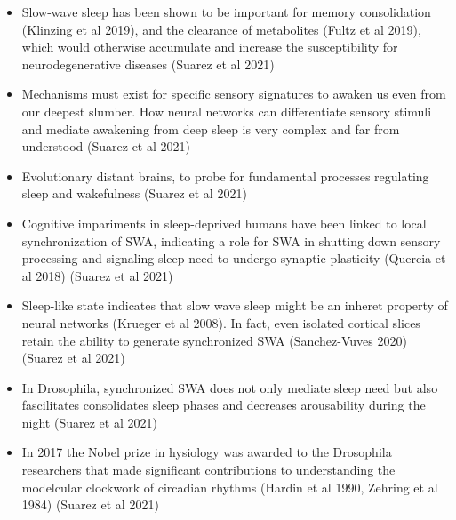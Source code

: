 \documentclass[11pt]{article}
\begin{document}
\begin{itemize}
    \item Slow-wave sleep has been shown to be important for memory consolidation (Klinzing et al 2019),
    and the clearance of metabolites (Fultz et al 2019), which would otherwise accumulate and increase the
    susceptibility for neurodegenerative diseases \cite{suarez-grimaltNeuralArchitectureSleep2021}
    (Suarez et al 2021)

    \item Mechanisms must exist for specific sensory signatures to awaken us even from our
    deepest slumber. How neural networks can differentiate sensory stimuli
    and mediate awakening from deep sleep is very complex and far from understood \cite{suarez-grimaltNeuralArchitectureSleep2021}
    (Suarez et al 2021)

    \item Evolutionary distant brains, to probe for fundamental processes regulating
    sleep and wakefulness \cite{suarez-grimaltNeuralArchitectureSleep2021}
    (Suarez et al 2021)

    \item Cognitive impariments in sleep-deprived humans have been linked to local
    synchronization of SWA, indicating a role for SWA in shutting down sensory
    processing and signaling sleep need to undergo synaptic plasticity (Quercia et al 2018)
    \cite{suarez-grimaltNeuralArchitectureSleep2021}
    (Suarez et al 2021)

    \item Sleep-like state indicates that slow wave sleep might be an inheret property
    of neural networks (Krueger et al 2008). In fact, even isolated cortical slices retain the ability
    to generate synchronized SWA (Sanchez-Vuves 2020) \cite{suarez-grimaltNeuralArchitectureSleep2021}
    (Suarez et al 2021)

    \item In Drosophila, synchronized SWA does not only mediate sleep need but also
    fascilitates consolidates sleep phases and decreases arousability during the
    night \cite{suarez-grimaltNeuralArchitectureSleep2021,raccugliaNetworkSpecificSynchronizationElectrical2019}
    (Suarez et al 2021)

    \item In 2017 the Nobel prize in hysiology was awarded to the Drosophila
    researchers that made significant contributions to understanding the
    modelcular clockwork of circadian rhythms (Hardin et al 1990, Zehring et al 1984)
    \cite{suarez-grimaltNeuralArchitectureSleep2021}
    (Suarez et al 2021)


\end{itemize}
\end{document}
